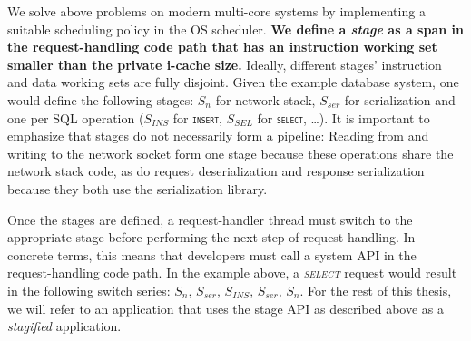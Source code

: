 \documentclass[12pt,a4paper]{book}
\begin{document}
We solve above problems on modern multi-core systems by implementing a suitable scheduling policy in the OS scheduler.
\textbf{We define a \emph{stage} as a span in the request-handling code path that has an instruction working set smaller than the private i-cache size.}
Ideally, different stages' instruction and data working sets are fully disjoint.
Given the example database system, one would define the following stages:
$S_n$ for network stack, $S_{ser}$ for serialization and one per SQL operation ($S_{INS}$ for \texttt{\textsc{insert}}, $S_{SEL}$ for \texttt{\textsc{select}}, \dots).
It is important to emphasize that stages do not necessarily form a pipeline:
Reading from and writing to the network socket form one stage because these operations share the network stack code, as do request deserialization and response serialization because they both use the serialization library.

Once the stages are defined, a request-handler thread must switch to the appropriate stage before performing the next step of request-handling.
In concrete terms, this means that developers must call a system API in the request-handling code path.
In the example above, a \textit{\textsc{select}} request would result in the following switch series: $S_n$, $S_{ser}$, $S_{INS}$, $S_{ser}$, $S_n$.
For the rest of this thesis, we will refer to an application that uses the stage API as described above as a \emph{stagified} application.

\end{document}
